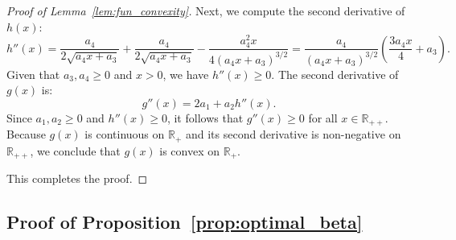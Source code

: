 \documentclass[runningheads]{llncs}
\begin{document}
\begin{proof}[Proof of Lemma~\ref{lem:fun_convexity}]
		Next, we compute the second derivative of $h(x)$:
		\begin{equation*}
			h''(x) = \frac{a_4}{2\sqrt{a_4 x + a_3}} + \frac{a_4}{2\sqrt{a_4 x + a_3}} - \frac{a_4^2 x}{4(a_4 x + a_3)^{3/2}} = \frac{a_4}{(a_4 x + a_3)^{3/2}} \left( \frac{3a_4 x}{4} + a_3 \right).
		\end{equation*}
		Given that $a_3, a_4 \geq 0$ and $x > 0$, we have $h''(x) \geq 0$. 
		The second derivative of $g(x)$ is:
		\begin{equation*}
			g''(x) = 2a_1 + a_2 h''(x).
		\end{equation*}
		Since $a_1, a_2 \geq 0$ and $h''(x) \geq 0$, it follows that $g''(x) \geq 0$ for all $x \in \mathbb{R}_{++}$. 
		Because $g(x)$ is continuous on $\mathbb{R}_{+}$ and its second derivative is non-negative on $\mathbb{R}_{++}$, we conclude that $g(x)$ is convex on $\mathbb{R}_{+}$.
		
		This completes the proof.
	\end{proof}
	
	\subsection{Proof of Proposition~\ref{prop:optimal_beta}}
	
\end{document}
